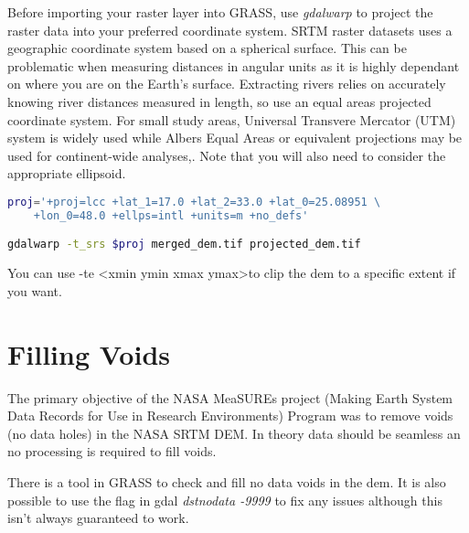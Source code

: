Before importing your raster layer into GRASS, use \textit{gdalwarp} to project the raster data into your preferred coordinate system. SRTM raster datasets uses a geographic coordinate system based on a spherical surface. This can be problematic when measuring distances in angular units as it is highly dependant on where you are on the Earth’s surface. Extracting rivers relies on accurately knowing river distances measured in length, so use an equal areas projected coordinate system. For small study areas, Universal Transvere Mercator (UTM) system is widely used while Albers Equal Areas or equivalent projections may be used for continent-wide analyses,. Note that you will also need to consider the appropriate ellipsoid. 

\begin{lstlisting}[language=bash]
proj='+proj=lcc +lat_1=17.0 +lat_2=33.0 +lat_0=25.08951 \
	+lon_0=48.0 +ellps=intl +units=m +no_defs'

gdalwarp -t_srs $proj merged_dem.tif projected_dem.tif
\end{lstlisting}

\noindent You can use -te \textless xmin ymin xmax ymax\textgreater  to clip the dem to a specific extent if you want. 

\section{Filling Voids}

The primary objective of the NASA MeaSUREs project (Making Earth System Data Records for Use in Research Environments) Program was to remove voids (no data holes) in the NASA SRTM DEM. In theory data should be seamless an no processing is required to fill voids. 

\noindent There is a tool in GRASS to check and fill no data voids in the dem. It is also possible to use the flag in gdal \textit{dstnodata -9999} to fix any issues although this isn’t always guaranteed to work. 